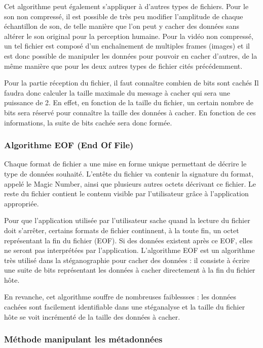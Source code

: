 \documentclass[11pt]{article}
\begin{document}
Cet algorithme peut également s'appliquer à d'autres types de fichiers. Pour le
son non compressé, il est possible de très peu modifier l'amplitude de chaque
échantillon de son, de telle manière que l'on peut y cacher des données sans
altérer le son original pour la perception humaine. Pour la vidéo non compressé,
un tel fichier est composé d'un enchaînement de multiples frames (images) et il
est donc possible de manipuler les données pour pouvoir en cacher d'autres, de
la même manière que pour les deux autres types de fichier cités précédemment.

Pour la partie réception du fichier, il faut connaître combien de bits sont
cachés  Il faudra donc calculer la taille maximale du message à cacher qui sera
une puissance de 2. En effet, en fonction de la taille du fichier, un certain
nombre de bits sera réservé pour connaître la taille des données à cacher. En
fonction de ces informations, la suite de bits cachée sera donc formée.

\subsubsection{Algorithme EOF (End Of File)}

Chaque format de fichier a une mise en forme unique permettant de décrire le
type de données souhaité. L'entête du fichier va contenir la signature du
format, appelé le Magic Number, ainsi que plusieurs autres octets décrivant ce
fichier. Le reste du fichier contient le contenu visible par l'utilisateur grâce
à l'application appropriée. 

Pour que l'application utilisée par l'utilisateur sache quand la lecture du
fichier doit s'arrêter, certains formats de fichier continnent, à la toute fin,
un octet représentant la fin du fichier (EOF). Si des données existent après ce
EOF, elles ne seront pas interprétées par l'application. L'algorithme EOF est un
algorithme très utilisé dans la stéganographie pour cacher des données : il
consiste à écrire une suite de bits représentant les données à cacher
directement à la fin du fichier hôte.

En revanche, cet algorithme souffre de nombreuses faiblessses : les données
cachées sont facilement identifiable dans une stéganalyse et la taille du
fichier hôte se voit incrémenté de la taille des données à cacher.

\subsubsection{Méthode manipulant les métadonnées}
\end{document}
